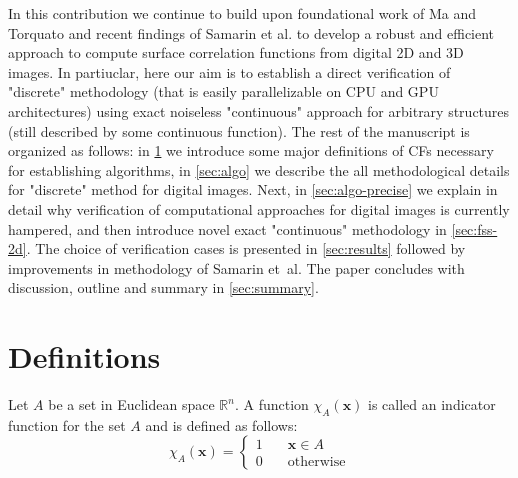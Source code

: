\documentclass[reprint,amsmath,amssymb,aps,pre,showkeys,showpacs]{revtex4-1}
\begin{document}
In this contribution we continue to build upon foundational work of Ma and
Torquato \cite{ma2018SS} and recent findings of Samarin et al. \cite{our_SS} to
develop a robust and efficient approach to compute surface correlation functions
from digital 2D and 3D images. In partiuclar, here our aim is to establish a
direct verification of "discrete" methodology (that is easily parallelizable on
CPU and GPU architectures) using exact noiseless "continuous" approach for
arbitrary structures (still described by some continuous function). The rest of
the manuscript is organized as follows: in \cref{sec:def} we introduce some
major definitions of CFs necessary for establishing algorithms, in
\cref{sec:algo} we describe the all methodological details for "discrete" method
for digital images. Next, in \cref{sec:algo-precise} we explain in detail why
verification of computational approaches for digital images is currently
hampered, and then introduce novel exact "continuous" methodology in
\cref{sec:fss-2d}. The choice of verification cases is presented in
\cref{sec:results} followed by improvements in methodology of Samarin et~al. The
paper concludes with discussion, outline and summary in \cref{sec:summary}.

\section{Definitions}
\label{sec:def}
Let $A$ be a set in Euclidean space $\mathbb{R}^n$. A function
$\chi_A(\mathbf{x})$ is called an indicator function for the set $A$ and is
defined as follows:
\begin{equation*}
  \chi_A(\bm{x}) = \left\{
  \begin{array}{ll}
    1 & \quad \bm{x} \in A \\
    0 & \quad \text{otherwise}
  \end{array}
  \right.
\end{equation*}
\end{document}
